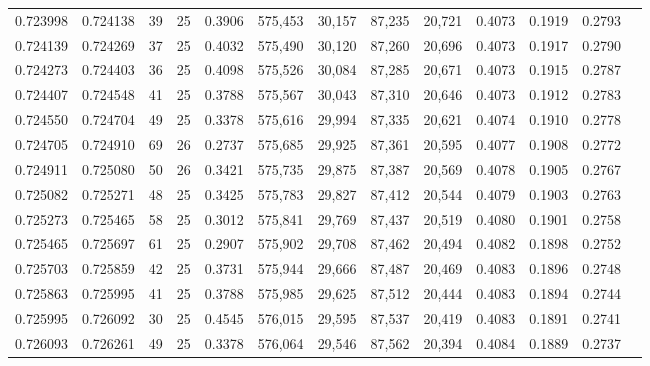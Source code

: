 \begin{tabular}{rrrrrrrrrrrrr}
0.723998 & 0.724138 &    39 &  25 &                                     0.3906 & 575,453 &  30,157 &  87,235 &  20,721 & 0.4073 & 0.1919 & 0.2793 \\
0.724139 & 0.724269 &    37 &  25 &                                     0.4032 & 575,490 &  30,120 &  87,260 &  20,696 & 0.4073 & 0.1917 & 0.2790 \\
0.724273 & 0.724403 &    36 &  25 &                                     0.4098 & 575,526 &  30,084 &  87,285 &  20,671 & 0.4073 & 0.1915 & 0.2787 \\
0.724407 & 0.724548 &    41 &  25 &                                     0.3788 & 575,567 &  30,043 &  87,310 &  20,646 & 0.4073 & 0.1912 & 0.2783 \\
0.724550 & 0.724704 &    49 &  25 &                                     0.3378 & 575,616 &  29,994 &  87,335 &  20,621 & 0.4074 & 0.1910 & 0.2778 \\
0.724705 & 0.724910 &    69 &  26 &                                     0.2737 & 575,685 &  29,925 &  87,361 &  20,595 & 0.4077 & 0.1908 & 0.2772 \\
0.724911 & 0.725080 &    50 &  26 &                                     0.3421 & 575,735 &  29,875 &  87,387 &  20,569 & 0.4078 & 0.1905 & 0.2767 \\
0.725082 & 0.725271 &    48 &  25 &                                     0.3425 & 575,783 &  29,827 &  87,412 &  20,544 & 0.4079 & 0.1903 & 0.2763 \\
0.725273 & 0.725465 &    58 &  25 &                                     0.3012 & 575,841 &  29,769 &  87,437 &  20,519 & 0.4080 & 0.1901 & 0.2758 \\
0.725465 & 0.725697 &    61 &  25 &                                     0.2907 & 575,902 &  29,708 &  87,462 &  20,494 & 0.4082 & 0.1898 & 0.2752 \\
0.725703 & 0.725859 &    42 &  25 &                                     0.3731 & 575,944 &  29,666 &  87,487 &  20,469 & 0.4083 & 0.1896 & 0.2748 \\
0.725863 & 0.725995 &    41 &  25 &                                     0.3788 & 575,985 &  29,625 &  87,512 &  20,444 & 0.4083 & 0.1894 & 0.2744 \\
0.725995 & 0.726092 &    30 &  25 &                                     0.4545 & 576,015 &  29,595 &  87,537 &  20,419 & 0.4083 & 0.1891 & 0.2741 \\
0.726093 & 0.726261 &    49 &  25 &                                     0.3378 & 576,064 &  29,546 &  87,562 &  20,394 & 0.4084 & 0.1889 & 0.2737 \\

\end{tabular}
